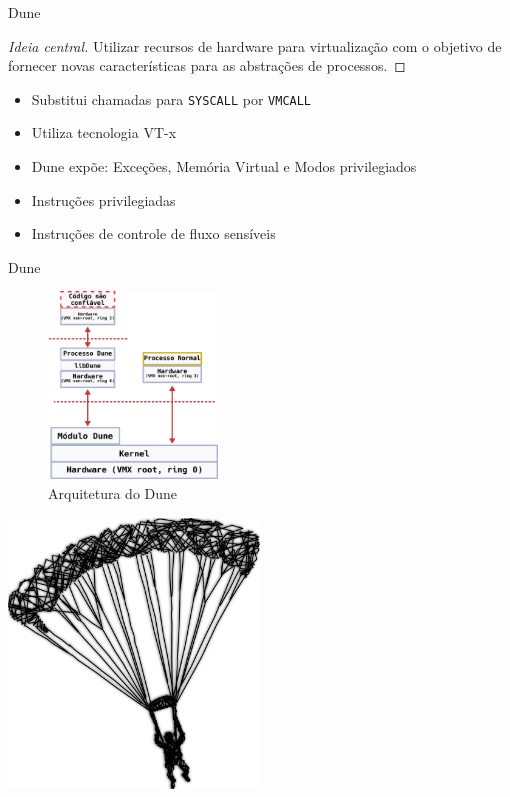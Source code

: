 \documentclass[xcolor={usenames,svgnames,dvipsnames},brazil,english,12pt,aspectratio=149]{beamer}
\begin{document}
\begin{frame}{Dune}

  \begin{proof}[Ideia central]
Utilizar recursos de hardware para virtualização com o objetivo de fornecer
novas características para as abstrações de processos.
  \end{proof}

    \begin{itemize}
      \item Substitui chamadas para \texttt{SYSCALL} por \texttt{VMCALL}
      \item Utiliza tecnologia VT-x
      \item Dune expõe: Exceções, Memória Virtual e Modos privilegiados
      \item Instruções privilegiadas
      \item Instruções de controle de fluxo sensíveis
    \end{itemize}

\end{frame}

\begin{frame}{Dune}
  \begin{figure}[!h]
    \centering
    \includegraphics[width=0.4\textwidth]{dune_architecture} 
    \caption*{Arquitetura do Dune}
  \end{figure}
\end{frame}

\begin{frame}[plain]
  \includegraphics[width=0.5\textwidth]{presentation_cap2_one}
\end{frame}
\end{document}
